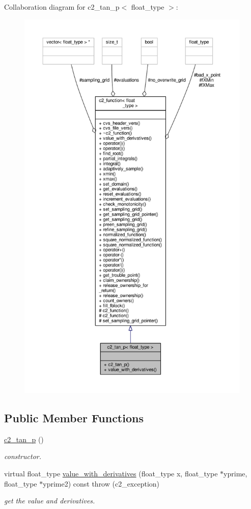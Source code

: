 Collaboration diagram for c2\+\_\+tan\+\_\+p$<$ float\+\_\+type $>$\+:
\nopagebreak
\begin{figure}[H]
\begin{center}
\leavevmode
\includegraphics[height=550pt]{classc2__tan__p__coll__graph}
\end{center}
\end{figure}
\subsection*{Public Member Functions}
\begin{DoxyCompactItemize}
\item 
\hyperlink{classc2__tan__p_a164b52d522c474fb35ea61a50d80cf4c}{c2\+\_\+tan\+\_\+p} ()
\begin{DoxyCompactList}\small\item\em constructor. \end{DoxyCompactList}\item 
virtual float\+\_\+type \hyperlink{classc2__tan__p_ac1e6ff8fd74a4d33ce189297fd16bbee}{value\+\_\+with\+\_\+derivatives} (float\+\_\+type x, float\+\_\+type $\ast$yprime, float\+\_\+type $\ast$yprime2) const   throw (c2\+\_\+exception)
\begin{DoxyCompactList}\small\item\em get the value and derivatives. \end{DoxyCompactList}\end{DoxyCompactItemize}
